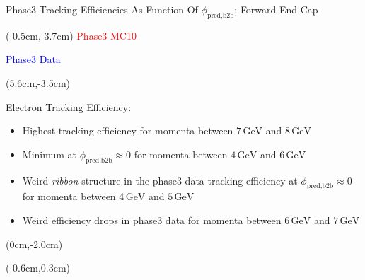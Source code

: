 \documentclass[8pt]{beamer}
\begin{document}
\begin{frame}{Phase3 Tracking Efficiencies As Function Of $\phi_{\textrm{pred,b2b}}$; Forward End-Cap}
	\begin{textblock*}{4cm}(-0.5cm,-3.7cm)
		\textcolor{red}{Phase3 MC10}
		
		\textcolor{blue}{Phase3 Data}
	\end{textblock*}
	
	
		\pause[2]
	
	
	\begin{textblock*}{6cm}(5.6cm,-3.5cm)
		\begin{mybox}
			Electron Tracking Efficiency:
			\begin{itemize}
				\item<2-> Highest tracking efficiency for momenta between $7\,\textrm{GeV}$ and $8\,\textrm{GeV}$
				\item<3-> Minimum at $\phi_{\textrm{pred,b2b}} \approx 0$ for momenta between $4\,\textrm{GeV}$ and $6\,\textrm{GeV}$
				\item<4-> Weird \textit{ribbon} structure in the phase3 data tracking efficiency at $\phi_{\textrm{pred,b2b}} \approx 0$ for momenta between $4\,\textrm{GeV}$ and $5\,\textrm{GeV}$
				\item<5-> Weird efficiency drops in phase3 data for momenta between $6\,\textrm{GeV}$ and $7\,\textrm{GeV}$
			\end{itemize}
		\end{mybox}
	\end{textblock*}
	
	
	\begin{textblock*}{5cm}(0cm,-2.0cm)
	\end{textblock*}
	
	
	\begin{textblock*}{5cm}(-0.6cm,0.3cm)
	\end{textblock*}
	
	\pause[6]
\end{frame}
\end{document}
